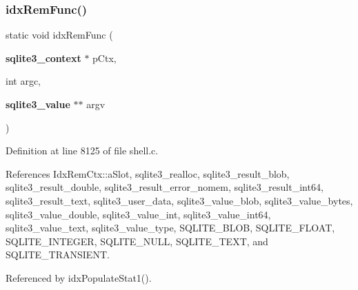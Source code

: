 \subsubsection{idx\+Rem\+Func()}
{\footnotesize\ttfamily static void idx\+Rem\+Func (\begin{DoxyParamCaption}\item[{\textbf{ sqlite3\+\_\+context} $\ast$}]{p\+Ctx,  }\item[{int}]{argc,  }\item[{\textbf{ sqlite3\+\_\+value} $\ast$$\ast$}]{argv }\end{DoxyParamCaption})\hspace{0.3cm}{\ttfamily [static]}}



Definition at line 8125 of file shell.\+c.



References Idx\+Rem\+Ctx\+::a\+Slot, sqlite3\+\_\+realloc, sqlite3\+\_\+result\+\_\+blob, sqlite3\+\_\+result\+\_\+double, sqlite3\+\_\+result\+\_\+error\+\_\+nomem, sqlite3\+\_\+result\+\_\+int64, sqlite3\+\_\+result\+\_\+text, sqlite3\+\_\+user\+\_\+data, sqlite3\+\_\+value\+\_\+blob, sqlite3\+\_\+value\+\_\+bytes, sqlite3\+\_\+value\+\_\+double, sqlite3\+\_\+value\+\_\+int, sqlite3\+\_\+value\+\_\+int64, sqlite3\+\_\+value\+\_\+text, sqlite3\+\_\+value\+\_\+type, S\+Q\+L\+I\+T\+E\+\_\+\+B\+L\+OB, S\+Q\+L\+I\+T\+E\+\_\+\+F\+L\+O\+AT, S\+Q\+L\+I\+T\+E\+\_\+\+I\+N\+T\+E\+G\+ER, S\+Q\+L\+I\+T\+E\+\_\+\+N\+U\+LL, S\+Q\+L\+I\+T\+E\+\_\+\+T\+E\+XT, and S\+Q\+L\+I\+T\+E\+\_\+\+T\+R\+A\+N\+S\+I\+E\+NT.



Referenced by idx\+Populate\+Stat1().


